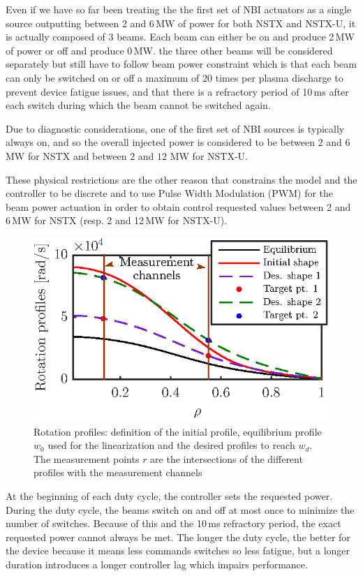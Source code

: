 \documentclass[12pt,lot, lof]{puthesis}
\begin{document}
Even if we have so far been treating the the first set of NBI actuators as a single source outputting between 2 and 6\,MW of power for both NSTX and NSTX-U, it is actually composed of 3 beams. Each beam can either be on and produce 2\,MW of power or off and produce 0\,MW. the three other beams will be considered separately but still have to follow beam power constraint which is that each beam can only be switched on or off a maximum of 20 times per plasma discharge to prevent device fatigue issues, and that there is a refractory period of 10\,ms after each switch during which the beam cannot be switched again.

Due to diagnostic considerations, one of the first set of NBI sources is typically always on, and so the overall injected power is considered to be between $2$ and $6$ MW for NSTX and  between $2$ and $12$ MW for NSTX-U.

These physical restrictions are the other reason that constrains the model and the controller to be discrete and to use Pulse Width Modulation (PWM) for the beam power actuation in order to obtain control requested values between 2 and 6\,MW for NSTX (resp. 2 and 12\,MW for NSTX-U).


\begin{figure}
	\centering
\includegraphics[width=0.7 \linewidth]{fig100}
\caption{Rotation profiles: definition of the initial profile, equilibrium profile $w_0$ used for the linearization and the desired profiles to reach $w_d$. The measurement points $r$ are the intersections of the different profiles with the measurement channels}
\label{go1}
\end{figure}

At the beginning of each duty cycle, the controller sets the requested power. During the duty cycle, the beams switch on and off at most once to minimize the number of switches. Because of this and the 10\,ms refractory period, the exact requested power cannot always be met.
The longer the duty cycle, the better for the device because it means less commands switches so less fatigue, but a longer duration introduces a longer controller lag which impairs performance.
\end{document}
